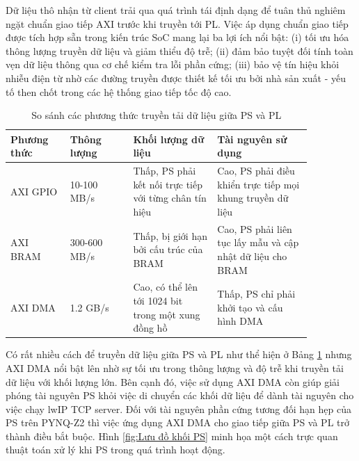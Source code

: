 \documentclass[../DoAn.tex]{subfiles}
\begin{document}
Dữ liệu thô nhận từ client trải qua quá trình tái định dạng để tuân thủ nghiêm ngặt chuẩn giao tiếp AXI trước khi truyền tới PL. Việc áp dụng chuẩn giao tiếp được tích hợp sẵn trong kiến trúc SoC mang lại ba lợi ích nổi bật: (i) tối ưu hóa thông lượng truyền dữ liệu và giảm thiểu độ trễ; (ii) đảm bảo tuyệt đối tính toàn vẹn dữ liệu thông qua cơ chế kiểm tra lỗi phần cứng; (iii) bảo vệ tín hiệu khỏi nhiễu điện từ nhờ các đường truyền được thiết kế tối ưu bởi nhà sản xuất - yếu tố then chốt trong các hệ thống giao tiếp tốc độ cao.  

\begin{table}[H]
\centering{}
    \caption{So sánh các phương thức truyền tải dữ liệu giữa PS và PL}
    \begin{tabular}{|p{0.17\linewidth} | p{0.18\linewidth}| p{0.24\linewidth}| p{0.27\linewidth}|}
        \hline
        \textbf{Phương thức} & \textbf{Thông lượng} & \textbf{Khối lượng dữ liệu}  & \textbf{Tài nguyên sử dụng}\\ \hline\hline
        AXI GPIO  & 10-100 MB/s  & Thấp, PS phải kết nối trực tiếp với từng chân tín hiệu   & Cao, PS phải điều khiển trực tiếp mọi khung truyền dữ liệu  \\ \hline
        AXI BRAM  & 300-600 MB/s & Thấp, bị giới hạn bởi cấu trúc của BRAM  & Cao, PS phải liên tục lấy mẫu và cập nhật dữ liệu cho BRAM   \\ \hline
        AXI DMA   & 1.2 GB/s & Cao, có thể lên tới 1024 bit trong một xung đồng hồ   & Thấp, PS chỉ phải khởi tạo và cấu hình DMA  \\ \hline
        \end{tabular}
    \label{table:So sánh các phương thức truyền tải dữ liệu giữa PS và PL}
\end{table}

Có rất nhiều cách để truyền dữ liệu giữa PS và PL như thể hiện ở Bảng \ref{table:So sánh các phương thức truyền tải dữ liệu giữa PS và PL} nhưng AXI DMA nổi bật lên nhờ sự tối ưu trong thông lượng và độ trễ khi truyền tải dữ liệu với khối lượng lớn. Bên cạnh đó, việc sử dụng AXI DMA còn giúp giải phóng tài nguyên PS khỏi việc di chuyển các khối dữ liệu để dành tài nguyên cho việc chạy lwIP TCP server. Đối với tài nguyên phần cứng tương đối hạn hẹp của PS trên PYNQ-Z2 \cite{noauthor_aup_nodate} thì việc ứng dụng AXI DMA cho giao tiếp giữa PS và PL trở thành điều bắt buộc. Hình \ref{fig:Lưu đồ khối PS} minh họa một cách trực quan thuật toán xử lý khi PS trong quá trình hoạt động.
\end{document}
